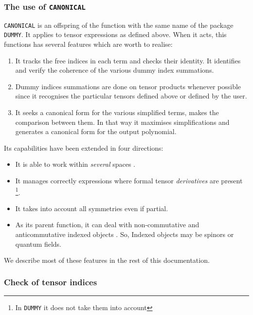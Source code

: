 \subsubsection{The use of \texttt{CANONICAL}}

\texttt{CANONICAL}  is an offspring of the function 
with the same name of the package \texttt{DUMMY}. 
It applies to tensor expressions as defined above.   
When it acts, this functions has several features which are 
worth to realise:
\begin{enumerate}
\item It tracks the free indices in each term  and checks their
identity.  It identifies and verify the coherence 
of the various dummy index summations.
\item Dummy indices summations are done on tensor products whenever 
possible since it recognises the particular tensors 
defined above or defined by the user.
\item It seeks a canonical form for the 
various simplified terms, makes the comparison between them.
In that way it maximises simplifications and generates a canonical form 
for the output polynomial.  
\end{enumerate}
Its capabilities  have been extended in four directions:
\begin{itemize}
\item It is able to work within \emph{several} spaces%
.
\item It manages correctly expressions where 
formal tensor \emph{derivatives} are present%
\footnote{In \texttt{DUMMY} it does not take them into account}. 
\item It takes into account all symmetries even if partial.
\item As its parent function, it can deal with non-commutative 
and anticommutative indexed objects%
.
So, Indexed objects may be spinors%
 or quantum fields.
\end{itemize}
We describe most of these features in the rest of this 
documentation.
\subsubsection{Check of tensor indices}

